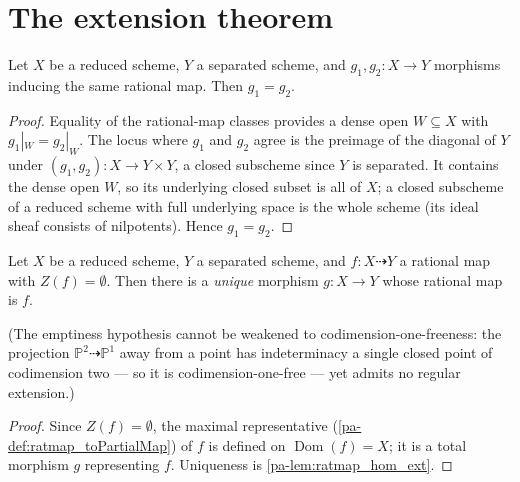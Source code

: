 \section{The extension theorem}
\label{pa-sec:extension}

\begin{lemma}
  \label{pa-lem:ratmap_hom_ext}
  \leanok

  Let \(X\) be a reduced scheme, \(Y\) a separated scheme, and
  \(g_1, g_2 : X \to Y\) morphisms inducing the same rational map. Then
  \(g_1 = g_2\).
\end{lemma}
\begin{proof}
  \leanok
  Equality of the rational-map classes provides a dense open
  \(W \subseteq X\) with \(g_1|_W = g_2|_W\). The locus where \(g_1\) and
  \(g_2\) agree is the preimage of the diagonal of \(Y\) under
  \((g_1, g_2) : X \to Y \times Y\), a closed subscheme since \(Y\) is
  separated. It contains the dense open \(W\), so its underlying closed subset
  is all of \(X\); a closed subscheme of a reduced scheme with full underlying
  space is the whole scheme (its ideal sheaf consists of nilpotents). Hence
  \(g_1 = g_2\).
\end{proof}

\begin{theorem}
  \label{pa-thm:extension_unique_of_empty}
  \leanok

  Let \(X\) be a reduced scheme, \(Y\) a separated scheme, and
  \(f : X \dashrightarrow Y\) a rational map with \(Z(f) = \emptyset\). Then
  there is a \emph{unique} morphism \(g : X \to Y\) whose rational map is
  \(f\).

  (The emptiness hypothesis cannot be weakened to
  codimension-one-freeness: the projection
  \(\mathbb P^2 \dashrightarrow \mathbb P^1\) away from a point has
  indeterminacy a single closed point of codimension two --- so it is
  codimension-one-free --- yet admits no regular extension.)
\end{theorem}
\begin{proof}
  \leanok
  Since \(Z(f) = \emptyset\), the maximal representative
  (\ref{pa-def:ratmap_toPartialMap}) of \(f\) is defined on
  \(\operatorname{Dom}(f) = X\); it is a total morphism \(g\) representing
  \(f\). Uniqueness is \ref{pa-lem:ratmap_hom_ext}.
\end{proof}

